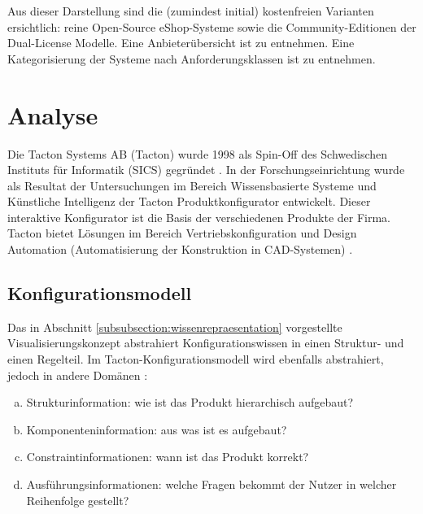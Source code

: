 \documentclass[12pt,a4paper,bibliography=totocnumbered,listof=totoc]{scrartcl}
\begin{document}
Aus dieser Darstellung sind die (zumindest initial) kostenfreien Varianten ersichtlich: reine Open-Source eShop-Systeme sowie die Community-Editionen der Dual-License Modelle. Eine Anbieterübersicht ist \citet{t3n14} zu entnehmen. Eine Kategorisierung der Systeme nach Anforderungsklassen ist \citet{graf14} zu entnehmen.

\pagebreak
\section{Analyse}
\label{section:Analyse}

Die Tacton Systems AB (Tacton) wurde 1998 als Spin-Off des Schwedischen Instituts für Informatik (SICS) gegründet \citep{tactonProductOverview}. In der Forschungseinrichtung wurde als Resultat der Untersuchungen im Bereich Wissensbasierte Systeme und Künstliche Intelligenz der Tacton Produktkonfigurator entwickelt. Dieser interaktive Konfigurator ist die Basis der verschiedenen Produkte der Firma. Tacton bietet Lösungen im Bereich Vertriebskonfiguration und Design Automation (Automatisierung der Konstruktion in CAD-Systemen) \citep{tactonAbout}.

\subsection{Konfigurationsmodell}
\label{subsection:Konfigurationsmodell}
Das in Abschnitt \ref{subsubsection:wissenrepraesentation} vorgestellte Visualisierungskonzept abstrahiert Konfigurationswissen in einen Struktur- und einen Regelteil. Im Tacton-Konfigurationsmodell wird ebenfalls abstrahiert, jedoch in andere Domänen \citep{tactonModeling}:

\begin{enumerate}[(a)]
\item \label{strukturinformation} Strukturinformation: wie ist das Produkt hierarchisch aufgebaut?
\item \label{komponenteninformation} Komponenteninformation: aus was ist es aufgebaut?
\item \label{constraintinformationen} Constraintinformationen: wann ist das Produkt korrekt?
\item \label{ausfuehrungsinformationen} Ausführungsinformationen: welche Fragen bekommt der Nutzer in welcher Reihenfolge gestellt?
\end{enumerate}
\end{document}
